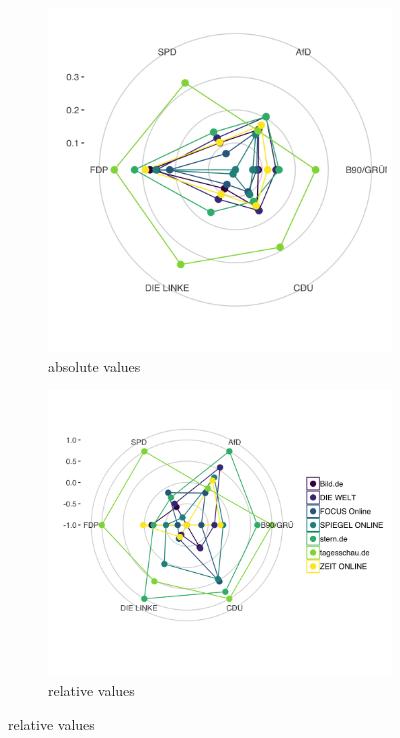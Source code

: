 \documentclass[12pt,a4paper,notitlepage]{article}
\begin{document}
\begin{figure}[H]
	\caption{Topic correlation - Radarcharts}
	\begin{center}
		\begin{subfigure}[normla]{0.42\textwidth}
			\includegraphics[width=\textwidth]{../figs/radar_corr}
			\caption{absolute values}
		\end{subfigure}
		\begin{subfigure}[normla]{0.52\textwidth}
			\includegraphics[width=\textwidth]{../figs/radar_corr_rescaled}
			\caption{relative values}
		\end{subfigure}
	\end{center}
\end{figure}
\end{document}
